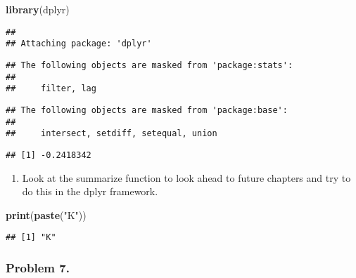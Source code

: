 \documentclass[]{article}
\newenvironment{Shaded}{\begin{snugshade}}{\end{snugshade}}
\newcommand{\KeywordTok}[1]{\textcolor[rgb]{0.13,0.29,0.53}{\textbf{#1}}}
\newcommand{\NormalTok}[1]{#1}
\newcommand{\OperatorTok}[1]{\textcolor[rgb]{0.81,0.36,0.00}{\textbf{#1}}}
\newcommand{\StringTok}[1]{\textcolor[rgb]{0.31,0.60,0.02}{#1}}
\providecommand{\tightlist}{%
  \setlength{\itemsep}{0pt}\setlength{\parskip}{0pt}}
\begin{document}
\begin{Shaded}
\begin{Highlighting}[]
\KeywordTok{library}\NormalTok{(dplyr)}
\end{Highlighting}
\end{Shaded}

\begin{verbatim}
## 
## Attaching package: 'dplyr'
\end{verbatim}

\begin{verbatim}
## The following objects are masked from 'package:stats':
## 
##     filter, lag
\end{verbatim}

\begin{verbatim}
## The following objects are masked from 'package:base':
## 
##     intersect, setdiff, setequal, union
\end{verbatim}

\begin{Shaded}
\end{Shaded}

\begin{verbatim}
## [1] -0.2418342
\end{verbatim}

\begin{enumerate}
\def\labelenumi{\alph{enumi}.}
\setcounter{enumi}{2}
\tightlist
\item
  Look at the summarize function to look ahead to future chapters and
  try to do this in the dplyr framework.
\end{enumerate}

\begin{Shaded}
\begin{Highlighting}[]
\KeywordTok{print}\NormalTok{(}\KeywordTok{paste}\NormalTok{(}\StringTok{"K"}\NormalTok{))}
\end{Highlighting}
\end{Shaded}

\begin{verbatim}
## [1] "K"
\end{verbatim}

\hypertarget{problem-7.}{%
\subsubsection{Problem 7.}\label{problem-7.}}
\end{document}
